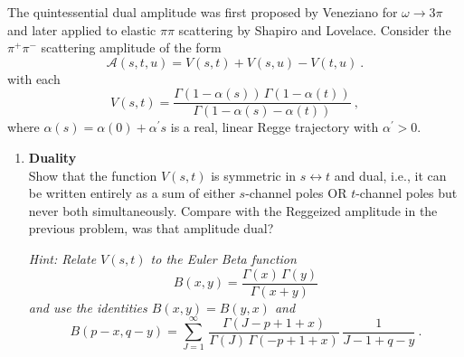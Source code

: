 The quintessential dual amplitude was first proposed by Veneziano for $\omega\to3\pi$ and later applied to elastic $\pi\pi$ scattering by Shapiro and Lovelace. Consider the $\pi^+\pi^-$ scattering amplitude of the form
\begin{equation}
    \label{eq:Astu}
    \mathcal{A}(s,t,u) = V(s,t) + V(s,u) - V(t,u) ~.
\end{equation}
with each
\begin{equation}
    \label{eq:Fst}
    V(s,t) = \frac{\Gamma(1-\alpha(s)) \, \Gamma(1-\alpha(t))}{\Gamma(1-\alpha(s) - \alpha(t))} ~,
\end{equation}
where $\alpha(s) = \alpha(0) + \alpha^\prime s$ is a real, linear Regge trajectory with $\alpha^\prime > 0$.

\begin{enumerate}
    \item \textbf{Duality} \\
          Show that the function $V(s,t)$ is symmetric in $s\leftrightarrow t$ and dual, i.e., it can be written entirely as a sum of either $s$-channel poles OR $t$-channel poles but never both simultaneously. Compare with the Reggeized amplitude in the previous problem, was that amplitude dual?

          \noindent \textit{Hint: Relate $V(s,t)$ to the Euler Beta function
              \begin{equation}
                  B(x,y) = \frac{\Gamma(x) \, \Gamma(y)}{\Gamma(x+y)}
              \end{equation}
              and use the identities $B(x,y) = B(y,x)$ and
              \begin{equation}
                  B(p-x, q-y) = \sum_{J=1}^\infty \, \frac{\Gamma(J-p+1 +x)}{\Gamma(J) \, \Gamma(-p + 1 +x)} \, \frac{1}{J-1+q-y} ~.
              \end{equation}
          }


\end{enumerate}
